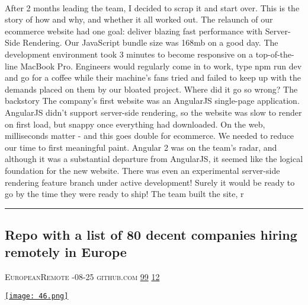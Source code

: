 \documentclass[10pt,a4paper]{article}
\begin{document}
\begin{multicols*}{2}
\paragraph{}
 After 2 months leading the team, I decided to scrap it and start over. This is the story of how and why, and whether it all worked out.
The relaunch of our ecommerce website had one goal: deliver blazing fast performance with Server-Side Rendering.
Our JavaScript bundle size was 168mb on a good day. The development environment took 3 minutes to become responsive on a top-of-the-line MacBook Pro. Engineers would regularly come in to work, type
npm run dev and go for a coffee while their machine's fans tried and failed to keep up with the demands placed on them by our bloated project.
Where did it go so wrong?
The backstory
The company's first website was an AngularJS single-page application. AngularJS didn't support server-side rendering, so the website was slow to render on first load, but snappy once everything had downloaded.
On the web, milliseconds matter - and this goes double for ecommerce. We needed to reduce our time to first meaningful paint.
Angular 2 was on the team's radar, and although it was a substantial departure from AngularJS, it seemed like the logical foundation for the new website. There was even an experimental server-side rendering feature branch under active development! Surely it would be ready to go by the time they were ready to ship!
The team built the site, r
\par\noindent\textcolor{red}{\rule{\linewidth}{0.2mm}}
\vfill
\null
\noindent\begin{minipage}{\linewidth}
\subsection{Repo with a list of 80 decent companies hiring remotely in Europe}
\textsc{\footnotesize
{\scriptsize\faUser}\space 
EuropeanRemote 
{\scriptsize\faCalendar}-08-25 
{\scriptsize\faGithub}\space 
github.com 
{\scriptsize\faThumbsOUp}\space 
\href{http://news.ycombinator.com/item?id=37144925\&utm\_term=comment}{99} 
{\scriptsize\faComments}\space 
\href{http://news.ycombinator.com/item?id=37144925\&utm\_term=comment}{12} 
}
\par\medskip\noindent
\href{https://github.com/EuropeanRemote/european-remote-software-companies?utm\_source=hackernewsletter\&utm\_medium=email\&utm\_term=working}{
    \texttt{[image: 46.png]}
}
\end{minipage}

\end{multicols*}
\end{document}
